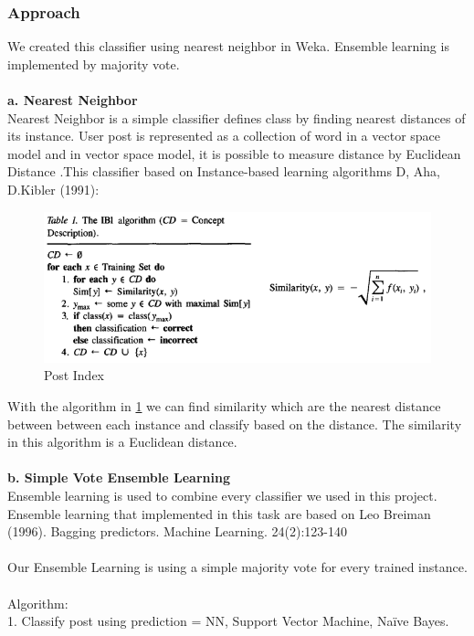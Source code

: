 \subsubsection*{Approach}
	We created this classifier using nearest neighbor in Weka. Ensemble learning is implemented by majority vote.\\\\
	\textbf{a. Nearest Neighbor} \\
		Nearest Neighbor is a simple classifier defines class by finding nearest distances of its instance. User post is represented as a collection of word in a vector space model and in vector space model, it is possible to measure distance by Euclidean Distance .This classifier based on Instance-based learning algorithms D, Aha, D.Kibler (1991): \\
	\begin{figure}[h]
		\begin{center}
			\includegraphics[scale=0.8]{images/NN1.png}
		\caption{Post Index\label{NN1}}
		\end{center}
	\end{figure}
		With the algorithm in \ref{NN1} we can find similarity which are the nearest distance between between each instance and classify based on the distance. The similarity in this algorithm is a Euclidean distance.\\\\
	\textbf{b. Simple Vote Ensemble Learning} \\
		Ensemble learning is used to combine every classifier we used in this project. Ensemble learning that implemented in this task are based on Leo Breiman (1996). Bagging predictors. Machine Learning. 24(2):123-140		 \\\\Our Ensemble Learning is using a simple majority vote for every trained instance.\\\\
		Algorithm:\\
		   1. Classify post using prediction = NN, Support Vector Machine, Naïve Bayes.\\
